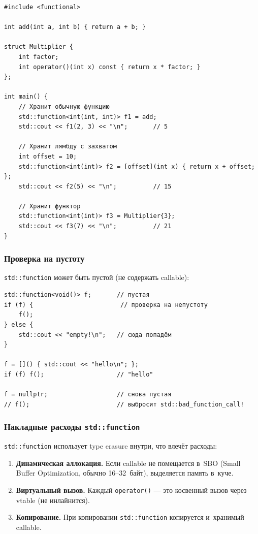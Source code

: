 \documentclass[a4paper,12pt]{article}
\begin{document}
\begin{lstlisting}
#include <functional>

int add(int a, int b) { return a + b; }

struct Multiplier {
    int factor;
    int operator()(int x) const { return x * factor; }
};

int main() {
    // Хранит обычную функцию
    std::function<int(int, int)> f1 = add;
    std::cout << f1(2, 3) << "\n";       // 5

    // Хранит лямбду с захватом
    int offset = 10;
    std::function<int(int)> f2 = [offset](int x) { return x + offset; };
    std::cout << f2(5) << "\n";          // 15

    // Хранит функтор
    std::function<int(int)> f3 = Multiplier{3};
    std::cout << f3(7) << "\n";          // 21
}
\end{lstlisting}

\subsubsection{Проверка на пустоту}

\texttt{std::function} может быть пустой (не содержать callable):

\begin{lstlisting}
std::function<void()> f;       // пустая
if (f) {                        // проверка на непустоту
    f();
} else {
    std::cout << "empty!\n";   // сюда попадём
}

f = []() { std::cout << "hello\n"; };
if (f) f();                    // "hello"

f = nullptr;                   // снова пустая
// f();                        // выбросит std::bad_function_call!
\end{lstlisting}

\subsubsection{Накладные расходы \texttt{std::function}}

\texttt{std::function} использует type erasure внутри, что влечёт расходы:

\begin{enumerate}
    \item \textbf{Динамическая аллокация.} Если callable не помещается в~SBO
          (Small Buffer Optimization, обычно 16--32~байт), выделяется память в~куче.
    \item \textbf{Виртуальный вызов.} Каждый \texttt{operator()} --- это косвенный
          вызов через vtable (не инлайнится).
    \item \textbf{Копирование.} При копировании \texttt{std::function} копируется
          и~хранимый callable.
\end{enumerate}
\end{document}
